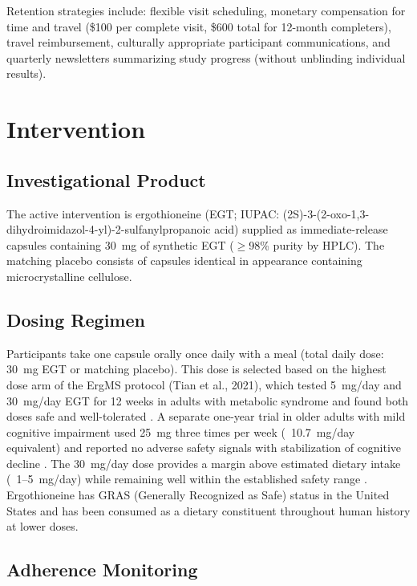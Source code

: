 \documentclass[11pt,a4paper]{article}
\begin{document}
Retention strategies include: flexible visit scheduling, monetary compensation for time and travel (\$100 per complete visit, \$600 total for 12-month completers), travel reimbursement, culturally appropriate participant communications, and quarterly newsletters summarizing study progress (without unblinding individual results).

\section{Intervention}

\subsection{Investigational Product}

The active intervention is ergothioneine (EGT; IUPAC: (2S)-3-(2-oxo-1,3-dihydroimidazol-4-yl)-2-sulfanylpropanoic acid) supplied as immediate-release capsules containing 30~mg of synthetic EGT ($\geq$98\% purity by HPLC). The matching placebo consists of capsules identical in appearance containing microcrystalline cellulose.

\subsection{Dosing Regimen}

Participants take one capsule orally once daily with a meal (total daily dose: 30~mg EGT or matching placebo). This dose is selected based on the highest dose arm of the ErgMS protocol (Tian et al., 2021), which tested 5~mg/day and 30~mg/day EGT for 12 weeks in adults with metabolic syndrome and found both doses safe and well-tolerated \cite{tian2021}. A separate one-year trial in older adults with mild cognitive impairment used 25~mg three times per week (~10.7~mg/day equivalent) and reported no adverse safety signals with stabilization of cognitive decline \cite{yau2024}. The 30~mg/day dose provides a margin above estimated dietary intake (~1--5~mg/day) while remaining well within the established safety range \cite{cheah2012}. Ergothioneine has GRAS (Generally Recognized as Safe) status in the United States and has been consumed as a dietary constituent throughout human history at lower doses.

\subsection{Adherence Monitoring}
\end{document}
